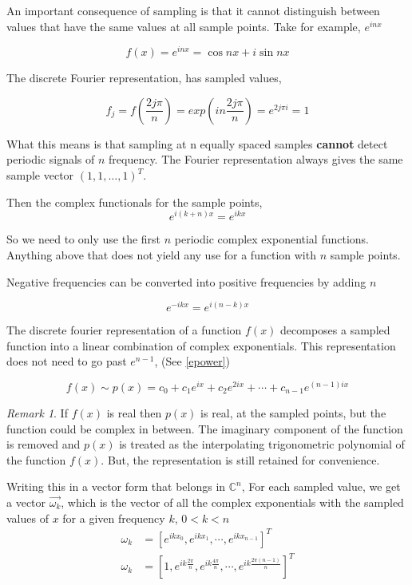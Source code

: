 \documentclass[11pt]{amsart}
\theoremstyle{definition}
\theoremstyle{remark}
\newtheorem{rem}[thm]{Remark}
\numberwithin{equation}{section}
\begin{document}
An important consequence of sampling is that it cannot distinguish between values that have the same values at all sample points.
Take for example, $e^{inx}$

\[
	f(x) = e^{inx} = \cos{nx} + i \sin{nx}
\]


The discrete Fourier representation, has sampled values,

\[
	f_j = f(\frac{2j \pi}{n}) = exp(in \frac{2j\pi}{n}) = e^{2j\pi i} = 1
\]

What this means is that sampling at n equally spaced samples \textbf{cannot} detect periodic signals of $n$ frequency. The Fourier representation always gives the same sample vector $(1,1,\dots, 1)^T$. 

Then the complex functionals for the sample points,
\begin{equation}
\label{epower} e^{i(k+n)x} = e^{ikx}
\end{equation}



So we need to only use the first $n$ periodic complex exponential functions. Anything above that does not yield any use for a function with $n$ sample points.

Negative frequencies can be converted into positive frequencies by adding $n$

\begin{equation}
	e^{-ikx} = e^{i(n-k)x} \label{negativefreq}
\end{equation}

The discrete fourier representation of a function $f(x)$ decomposes a sampled function into a linear combination of complex exponentials. This representation does not need to go past $e^{n-1}$, (See \ref{epower})

\begin{equation}
	f(x) \sim p(x) = c_0 + c_1 e^{ix} + c_2 e^{2ix} + \cdots + c_{n-1}e^{(n-1)ix}
	\label{repcomp}
\end{equation}
\begin{rem}
	If $f(x)$ is real then $p(x)$ is real, at the sampled points, but the function could be complex in between. The imaginary component of the function is removed and $p(x)$ is treated as the interpolating trigonometric polynomial of the function $f(x)$. But, the representation is still retained for convenience.
\end{rem}

Writing this in a vector form that belongs in $\mathbb{C}^n$, For each sampled value, we get a vector $\vec{\omega_k}$, which is the vector of all the complex exponentials with the sampled values of $x$ for a given frequency $k$, $0 < k < n$
\begin{align*}
	\omega_k &= [e^{i k x_0},e^{ik x_1},\cdots,e^{ik x_{n-1}}]^T \\
	\omega_k &= [1,e^{i k \frac{2\pi}{n}},e^{ik \frac{4\pi}{n}},\cdots,e^{ik \frac{2\pi(n-1)}{n}}]^T \\
\end{align*}
\end{document}

